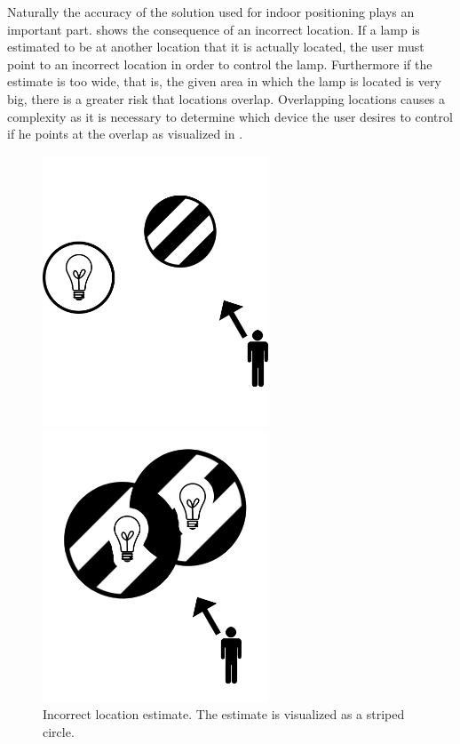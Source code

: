 Naturally the accuracy of the solution used for indoor positioning plays an important part. 
 shows the consequence of an incorrect location. 
If a lamp is estimated to be at another location that it is actually located, 
the user must point to an incorrect location in order to control the lamp.
Furthermore if the estimate is too wide, that is, the given area in which the lamp is located is very big, there is a greater risk that locations overlap. 
Overlapping locations causes a complexity as it is necessary to determine which device the user desires to control if he points at the overlap as visualized in .

\begin{figure}[!htb]
    \centering
    \begin{minipage}[t]{0.45\textwidth}
        \centering
        \includegraphics[width=0.6\textwidth]{images/incorrect-positioning-estimate.png}
        \caption{Incorrect location estimate. The estimate is visualized as a striped circle.}
        \label{fig:indoor-positioning:incorrect}
    \end{minipage}\qquad
    \begin{minipage}[t]{0.45\textwidth}
        \centering
        \includegraphics[width=0.6\textwidth]{images/positioning-overlap.png}

\end{minipage}
\end{figure}
